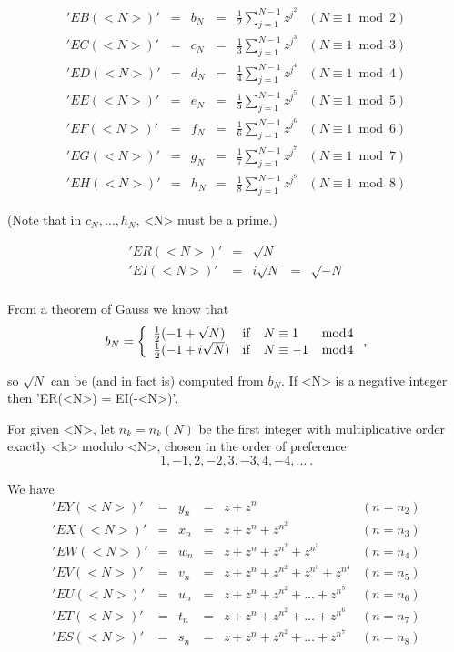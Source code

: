 \[\begin{array}{llllll}
'EB(<N>)' & = & b_N & = & \frac{1}{2}\sum_{j=1}^{N-1}z^{j^{2}} &
 (N\equiv 1\bmod 2)\\

'EC(<N>)' & = & c_N & = & \frac{1}{3}\sum_{j=1}^{N-1}z^{j^{3}} &
 (N\equiv 1\bmod 3)\\

'ED(<N>)' & = & d_N & = & \frac{1}{4}\sum_{j=1}^{N-1}z^{j^{4}} &
 (N\equiv 1\bmod 4)\\

'EE(<N>)' & = & e_N & = & \frac{1}{5}\sum_{j=1}^{N-1}z^{j^{5}} &
 (N\equiv 1\bmod 5)\\

'EF(<N>)' & = & f_N & = & \frac{1}{6}\sum_{j=1}^{N-1}z^{j^{6}} &
 (N\equiv 1\bmod 6)\\

'EG(<N>)' & = & g_N & = & \frac{1}{7}\sum_{j=1}^{N-1}z^{j^{7}} &
 (N\equiv 1\bmod 7)\\

'EH(<N>)' & = & h_N & = & \frac{1}{8}\sum_{j=1}^{N-1}z^{j^{8}} &
 (N\equiv 1\bmod 8)
\end{array}\]

(Note that in $c_N, \ldots, h_N$, <N> must be a prime.)

\[\begin{array}{lllll}
'ER(<N>)' & = & \sqrt{N}\\
'EI(<N>)' & = & i \sqrt{N} & = & \sqrt{-N}\\
\end{array}\]

From a theorem of Gauss we know that
\[ b_N = \left\{ \begin{array}{llll}
          \frac{1}{2}(-1+\sqrt{N}) & {\rm if} & N\equiv 1 & \bmod 4 \\
          \frac{1}{2}(-1+i\sqrt{N}) & {\rm if} & N\equiv -1 & \bmod 4
          \end{array}\right. ,\]

so $\sqrt{N}$ can be (and in fact is) computed from $b_N$. If <N> is a
negative integer then 'ER(<N>) = EI(-<N>)'.

For  given  <N>,  let  $n_k  =  n_k(N)$  be  the  first  integer  with
multiplicative order  exactly <k>  modulo <N>, chosen  in the order of
preference
\[ 1, -1, 2, -2, 3, -3, 4, -4, \ldots\ .\]

We have
\[\begin{array}{llllll}
'EY(<N>)' & = & y_n & = & z+z^n &(n = n_2)\\
'EX(<N>)' & = & x_n & = & z+z^n+z^{n^2} &(n=n_3)\\
'EW(<N>)' & = & w_n & = & z+z^n+z^{n^2}+z^{n^3} &(n=n_4)\\
'EV(<N>)' & = & v_n & = & z+z^n+z^{n^2}+z^{n^3}+z^{n^4} &(n=n_5)\\
'EU(<N>)' & = & u_n & = & z+z^n+z^{n^2}+\ldots +z^{n^5} &(n=n_6)\\
'ET(<N>)' & = & t_n & = & z+z^n+z^{n^2}+\ldots +z^{n^6} &(n=n_7)\\
'ES(<N>)' & = & s_n & = & z+z^n+z^{n^2}+\ldots +z^{n^7} &(n=n_8)
\end{array}\]

